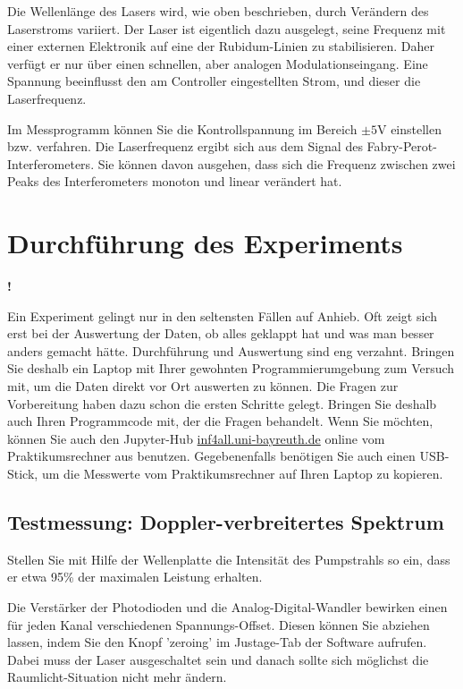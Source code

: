 Die Wellenlänge des Lasers wird, wie oben beschrieben, durch Verändern des Laserstroms variiert. Der Laser ist eigentlich dazu ausgelegt, seine Frequenz mit einer externen Elektronik auf eine der Rubidum-Linien zu stabilisieren. Daher verfügt er nur über einen schnellen, aber analogen Modulationseingang. Eine Spannung beeinflusst den am Controller eingestellten Strom, und dieser die Laserfrequenz.

Im Messprogramm können Sie die Kontrollspannung im Bereich $\pm 5$V einstellen bzw. verfahren. Die Laserfrequenz ergibt sich aus dem Signal des Fabry-Perot-Interferometers. Sie können davon ausgehen, dass sich die Frequenz zwischen zwei Peaks des Interferometers monoton und linear verändert hat. 


\section{Durchführung des Experiments}

\begin{marginfigure}[10mm]{\Huge \textbf{!}}\end{marginfigure}%
Ein Experiment gelingt nur in den seltensten Fällen auf Anhieb. Oft zeigt sich erst bei der Auswertung der Daten, ob alles geklappt hat und was man besser anders gemacht hätte. Durchführung und Auswertung sind eng verzahnt. Bringen Sie deshalb ein Laptop mit Ihrer gewohnten Programmierumgebung zum Versuch mit, um die Daten direkt vor Ort auswerten zu können. Die Fragen zur Vorbereitung haben dazu schon die ersten Schritte gelegt. Bringen Sie deshalb auch Ihren Programmcode mit, der die Fragen behandelt. Wenn Sie möchten, können Sie auch den Jupyter-Hub \url{inf4all.uni-bayreuth.de} online vom Praktikumsrechner aus benutzen. Gegebenenfalls benötigen Sie auch einen USB-Stick, um die Messwerte vom Praktikumsrechner auf Ihren Laptop zu kopieren.







\subsection{Testmessung: Doppler-verbreitertes Spektrum}

Stellen Sie mit Hilfe der Wellenplatte die Intensität des Pumpstrahls so ein, dass er etwa 95\%  der maximalen Leistung erhalten.

Die Verstärker der Photodioden und die Analog-Digital-Wandler bewirken einen für jeden Kanal verschiedenen Spannungs-Offset. Diesen können Sie abziehen lassen, indem Sie den Knopf 'zeroing' im Justage-Tab der Software aufrufen. Dabei muss der Laser ausgeschaltet sein und danach sollte sich möglichst die Raumlicht-Situation nicht mehr ändern.

